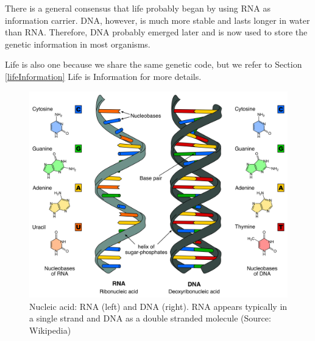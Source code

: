 \documentclass[
  11pt,
]{book}
\begin{document}
There is a general consensus that life probably began by using RNA as information carrier.
DNA, however, is much more stable and lasts longer in water than RNA. Therefore, DNA probably emerged later and is now used to store the genetic information in most organisms.

Life is also one because we share the same genetic code, but we refer to Section \ref{lifeInformation} Life is Information for more details.

\begin{figure}

{\centering \includegraphics[width=0.5\linewidth]{./figs/Difference_DNA_RNA-EN} 

}

\caption{Nucleic acid: RNA (left) and DNA (right). RNA appears typically in a single strand and DNA as a double stranded molecule (Source: Wikipedia)}\label{fig:RNAvsDNA}
\end{figure}
\end{document}

